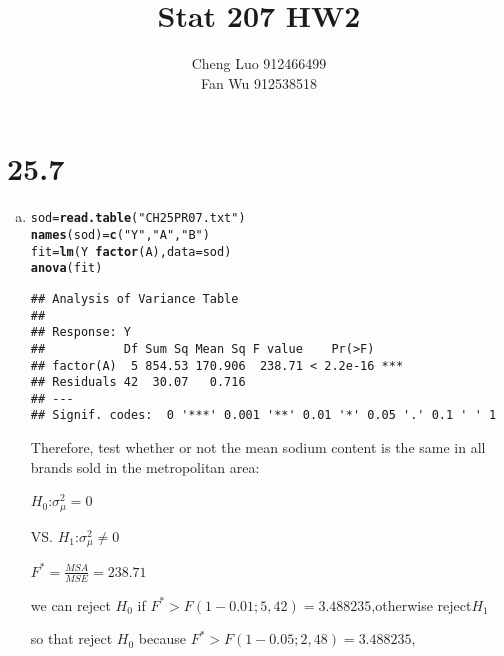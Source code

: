 \documentclass{article}\usepackage[]{graphicx}\usepackage[]{color}
\makeatletter
\newcommand{\hlstr}[1]{\textcolor[rgb]{0.192,0.494,0.8}{#1}}%
\newcommand{\hlopt}[1]{\textcolor[rgb]{0,0,0}{#1}}%
\newcommand{\hlstd}[1]{\textcolor[rgb]{0.345,0.345,0.345}{#1}}%
\newcommand{\hlkwb}[1]{\textcolor[rgb]{0.69,0.353,0.396}{#1}}%
\newcommand{\hlkwc}[1]{\textcolor[rgb]{0.333,0.667,0.333}{#1}}%
\newcommand{\hlkwd}[1]{\textcolor[rgb]{0.737,0.353,0.396}{\textbf{#1}}}%
\newenvironment{kframe}{%
 \def\at@end@of@kframe{}%
 \ifinner\ifhmode%
  \def\at@end@of@kframe{\end{minipage}}%
  \begin{minipage}{\columnwidth}%
 \fi\fi%
 \def\FrameCommand##1{\hskip\@totalleftmargin \hskip-\fboxsep
 \colorbox{shadecolor}{##1}\hskip-\fboxsep
     \hskip-\linewidth \hskip-\@totalleftmargin \hskip\columnwidth}%
 \MakeFramed {\advance\hsize-\width
   \@totalleftmargin\z@ \linewidth\hsize
   \@setminipage}}%
 {\par\unskip\endMakeFramed%
 \at@end@of@kframe}
\newenvironment{knitrout}{}{} %
\makeatother
\begin{document}
\title{\huge \textbf{Stat 207 HW2} \\}
\author{\large Cheng Luo 912466499 \\ \large Fan Wu 912538518}
\maketitle

\clearpage

\section {25.7}

\begin{enumerate}[(a)]

\item

\begin{knitrout}
\color{fgcolor}\begin{kframe}
\begin{alltt}
  \hlstd{sod} \hlkwb{=} \hlkwd{read.table}\hlstd{(}\hlstr{"CH25PR07.txt"}\hlstd{)}
  \hlkwd{names}\hlstd{(sod)} \hlkwb{=} \hlkwd{c}\hlstd{(}\hlstr{"Y"}\hlstd{,} \hlstr{"A"}\hlstd{,} \hlstr{"B"}\hlstd{)}
  \hlstd{fit} \hlkwb{=} \hlkwd{lm}\hlstd{(Y} \hlopt{~} \hlkwd{factor}\hlstd{(A),} \hlkwc{data} \hlstd{= sod)}
  \hlkwd{anova}\hlstd{(fit)}
\end{alltt}
\begin{verbatim}
## Analysis of Variance Table
## 
## Response: Y
##           Df Sum Sq Mean Sq F value    Pr(>F)    
## factor(A)  5 854.53 170.906  238.71 < 2.2e-16 ***
## Residuals 42  30.07   0.716                      
## ---
## Signif. codes:  0 '***' 0.001 '**' 0.01 '*' 0.05 '.' 0.1 ' ' 1
\end{verbatim}
\end{kframe}
\end{knitrout}

Therefore, test whether or not the mean sodium content is the same in all brands sold in the metropolitan area:

\begin{center}
$H_0$:$\sigma_\mu^2=0$

VS. $H_1$:$\sigma_\mu^2 \ne 0$

$F^*=\frac{MSA}{MSE} = 238.71$

we can reject $H_0$ if $F^* > F(1-0.01;5,42)=3.488235$,otherwise reject$H_1$

so that reject $H_0$ because $F^*>F(1-0.05;2,48)=3.488235$,


\end{center}
\end{enumerate}
\end{document}
